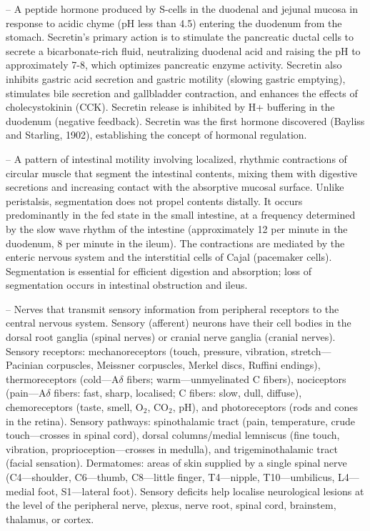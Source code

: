 -- A peptide hormone produced by S-cells in the duodenal and jejunal mucosa in response to acidic chyme (pH less than 4.5) entering the duodenum from the stomach. Secretin's primary action is to stimulate the pancreatic ductal cells to secrete a bicarbonate-rich fluid, neutralizing duodenal acid and raising the pH to approximately 7-8, which optimizes pancreatic enzyme activity. Secretin also inhibits gastric acid secretion and gastric motility (slowing gastric emptying), stimulates bile secretion and gallbladder contraction, and enhances the effects of cholecystokinin (CCK). Secretin release is inhibited by H+ buffering in the duodenum (negative feedback). Secretin was the first hormone discovered (Bayliss and Starling, 1902), establishing the concept of hormonal regulation.

-- A pattern of intestinal motility involving localized, rhythmic contractions of circular muscle that segment the intestinal contents, mixing them with digestive secretions and increasing contact with the absorptive mucosal surface. Unlike peristalsis, segmentation does not propel contents distally. It occurs predominantly in the fed state in the small intestine, at a frequency determined by the slow wave rhythm of the intestine (approximately 12 per minute in the duodenum, 8 per minute in the ileum). The contractions are mediated by the enteric nervous system and the interstitial cells of Cajal (pacemaker cells). Segmentation is essential for efficient digestion and absorption; loss of segmentation occurs in intestinal obstruction and ileus.

-- Nerves that transmit sensory information from peripheral receptors to the central nervous system. Sensory (afferent) neurons have their cell bodies in the dorsal root ganglia (spinal nerves) or cranial nerve ganglia (cranial nerves). Sensory receptors: mechanoreceptors (touch, pressure, vibration, stretch—Pacinian corpuscles, Meissner corpuscles, Merkel discs, Ruffini endings), thermoreceptors (cold—A\(\delta\) fibers; warm—unmyelinated C fibers), nociceptors (pain—A\(\delta\) fibers: fast, sharp, localised; C fibers: slow, dull, diffuse), chemoreceptors (taste, smell, O$_2$, CO$_2$, pH), and photoreceptors (rods and cones in the retina). Sensory pathways: spinothalamic tract (pain, temperature, crude touch—crosses in spinal cord), dorsal columns/medial lemniscus (fine touch, vibration, proprioception—crosses in medulla), and trigeminothalamic tract (facial sensation). Dermatomes: areas of skin supplied by a single spinal nerve (C4—shoulder, C6—thumb, C8—little finger, T4—nipple, T10—umbilicus, L4—medial foot, S1—lateral foot). Sensory deficits help localise neurological lesions at the level of the peripheral nerve, plexus, nerve root, spinal cord, brainstem, thalamus, or cortex.

